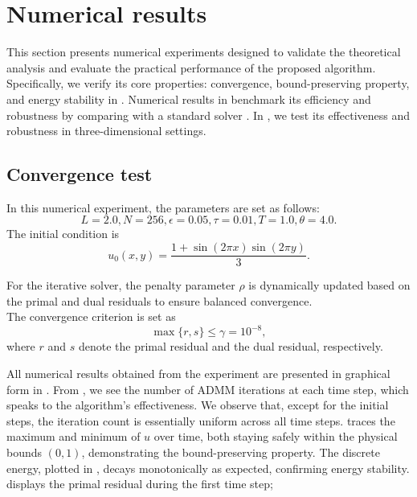 \section{Numerical results}
\label{sec:numerical}
This section presents numerical experiments designed to validate the theoretical analysis and evaluate the practical performance of the proposed algorithm. 
Specifically, we verify its core properties: convergence, bound-preserving property, and energy stability in . 
Numerical results in  benchmark its efficiency and robustness by comparing  with a standard solver . 
In , we test its effectiveness and robustness in three-dimensional settings.

\subsection{Convergence test}
\label{subsec:test}
In this numerical experiment, the parameters are set as follows:
\begin{equation}
    L=2.0, N=256,\epsilon=0.05, \tau=0.01, T=1.0, \theta=4.0.
\end{equation}
The initial condition is
\begin{equation}
    u_0(x,y)=\frac{1+\sin(2\pi x)\sin(2\pi y)}{3}.
\end{equation}
\par For the iterative solver, the penalty parameter $\rho$ is dynamically updated based on the primal and dual residuals to ensure balanced convergence. \\
The convergence criterion is set as
\begin{equation}
    \max\{r,s\}\leq \gamma=10^{-8},
\end{equation}
where $r$ and $s$ denote the primal residual and the dual residual, respectively.
\par All numerical results obtained from the experiment are presented in graphical form in .
From , we see the number of ADMM iterations at each time step, which speaks to the algorithm's effectiveness. 
We observe that, except for the initial steps, the iteration count is essentially uniform across all time steps.
 traces the maximum and minimum of $u$ over time, both staying safely within the physical bounds $(0,1)$, demonstrating the bound-preserving property. 
The discrete energy, plotted in , decays monotonically as expected, confirming energy stability. 
 displays the primal residual during the first time step; 

